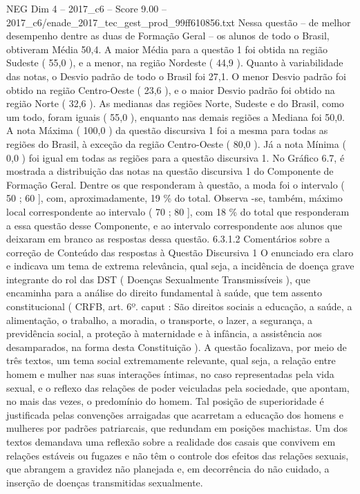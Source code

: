 \begin{textsample}{NEG Dim 4 – 2017\_c6 – Score 9.00 – 2017\_c6/enade\_2017\_tec\_gest\_prod\_99ff610856.txt}
Nessa questão – de melhor desempenho dentre as duas de Formação Geral – os alunos de todo o Brasil, obtiveram Média 50,4.
A maior Média para a questão 1 foi obtida na região Sudeste ( 55,0 ), e a menor, na região Nordeste ( 44,9 ).
Quanto à variabilidade das notas, o Desvio padrão de todo o Brasil foi 27,1.
O menor Desvio padrão foi obtido na região Centro-Oeste ( 23,6 ), e o maior Desvio padrão foi obtido na região Norte ( 32,6 ).
As medianas das regiões Norte, Sudeste e do Brasil, como um todo, foram iguais ( 55,0 ), enquanto nas demais regiões a Mediana foi 50,0.
A nota Máxima ( 100,0 ) da questão discursiva 1 foi a mesma para todas as regiões do Brasil, à exceção da região Centro-Oeste ( 80,0 ).
Já a nota Mínima ( 0,0 ) foi igual em todas as regiões para a questão discursiva 1.
No Gráfico 6.7, é mostrada a distribuição das notas na questão discursiva 1 do Componente de Formação Geral.
Dentre os que responderam à questão, a moda foi o intervalo ( 50 ; 60 ], com, aproximadamente, 19 \% do total.
Observa -se, também, máximo local correspondente ao intervalo ( 70 ; 80 ], com 18 \% do total que responderam a essa questão desse Componente, e ao intervalo correspondente aos alunos que deixaram em branco as respostas dessa questão. 6.3.1.2 Comentários sobre a correção de Conteúdo das respostas à Questão Discursiva 1 O enunciado era claro e indicava um tema de extrema relevância, qual seja, a incidência de doença grave integrante do rol das DST ( Doenças Sexualmente Transmissíveis ), que encaminha para a análise do direito fundamental à saúde, que tem assento constitucional ( CRFB, art. 6º. caput : São direitos sociais a educação, a saúde, a alimentação, o trabalho, a moradia, o transporte, o lazer, a segurança, a previdência social, a proteção à maternidade e à infância, a assistência aos desamparados, na forma desta Constituição ).
A questão focalizava, por meio de três textos, um tema social extremamente relevante, qual seja, a relação entre homem e mulher nas suas interações íntimas, no caso representadas pela vida sexual, e o reflexo das relações de poder veiculadas pela sociedade, que apontam, no mais das vezes, o predomínio do homem.
Tal posição de superioridade é justificada pelas convenções arraigadas que acarretam a educação dos homens e mulheres por padrões patriarcais, que redundam em posições machistas.
Um dos textos demandava uma reflexão sobre a realidade dos casais que convivem em relações estáveis ou fugazes e não têm o controle dos efeitos das relações sexuais, que abrangem a gravidez não planejada e, em decorrência do não cuidado, a inserção de doenças transmitidas sexualmente.

\end{textsample}
